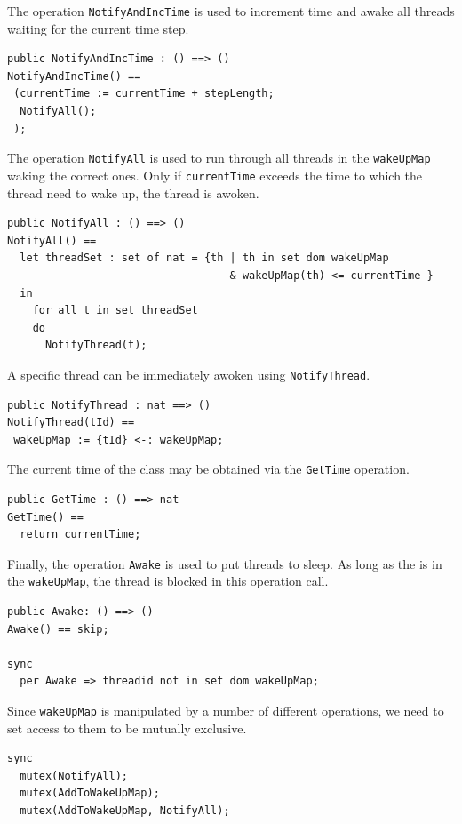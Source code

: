 \documentclass{overturerepchap}
\begin{document}
The operation \texttt{NotifyAndIncTime} is used to increment time and
awake all threads waiting for the current time step.

\begin{lstlisting}
public NotifyAndIncTime : () ==> ()
NotifyAndIncTime() ==
 (currentTime := currentTime + stepLength;
  NotifyAll();
 );
\end{lstlisting}

The operation \texttt{NotifyAll} is used to run through all threads in the 
\texttt{wakeUpMap} waking the correct ones. Only if \texttt{currentTime}
exceeds the time to which the thread need to wake up, the thread is awoken.

\begin{lstlisting}
public NotifyAll : () ==> ()
NotifyAll() ==
  let threadSet : set of nat = {th | th in set dom wakeUpMap 
                                   & wakeUpMap(th) <= currentTime }
  in
    for all t in set threadSet 
    do
      NotifyThread(t);
\end{lstlisting}

A specific thread can be immediately awoken
using \texttt{NotifyThread}.

\begin{lstlisting}
public NotifyThread : nat ==> ()
NotifyThread(tId) ==
 wakeUpMap := {tId} <-: wakeUpMap;
\end{lstlisting}

The current time of the class may be obtained via the \texttt{GetTime}
operation.

\begin{lstlisting}
public GetTime : () ==> nat
GetTime() ==
  return currentTime;
\end{lstlisting}

Finally, the operation \texttt{Awake} is used to put threads to
sleep. As long as the {\bf{}} is in the
\texttt{wakeUpMap}, the thread is blocked in this operation call.

\begin{lstlisting}
public Awake: () ==> ()
Awake() == skip;

sync
  per Awake => threadid not in set dom wakeUpMap;
\end{lstlisting}

Since \texttt{wakeUpMap} is manipulated by a number of different
operations, we need to set access to them to be mutually exclusive.

\begin{lstlisting}
sync
  mutex(NotifyAll);
  mutex(AddToWakeUpMap);
  mutex(AddToWakeUpMap, NotifyAll); 
\end{lstlisting}
\end{document}
